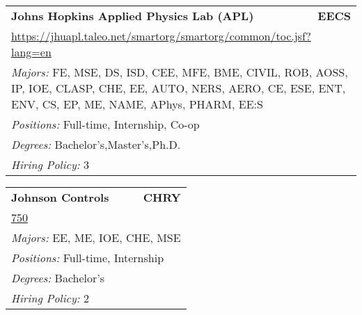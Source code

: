 \documentclass[twoside]{article}
\begin{document}
\begin{center}
\begin{multicols}{3}
\begin{FlushLeft}
\begin{minipage}{.9\columnwidth}\begin{tabularx}{.95\columnwidth}{Xr}
                 {\Large\bf Johns Hopkins Applied Physics Lab (APL)} & {\Large\bf EECS}\\
    \multicolumn{2}{p{.95\columnwidth}}{\url{https://jhuapl.taleo.net/smartorg/smartorg/common/toc.jsf?lang=en}}\\
    \multicolumn{2}{p{.95\columnwidth}}{\emph{Majors:} FE, MSE, DS, ISD, CEE, MFE, BME, CIVIL, ROB, AOSS, IP, IOE, CLASP, CHE, EE, AUTO, NERS, AERO, CE, ESE, ENT, ENV, CS, EP, ME, NAME, APhys, PHARM, EE:S}\\
    \multicolumn{2}{p{.95\columnwidth}}{\emph{Positions:} Full-time, Internship, Co-op}\\
    \multicolumn{2}{p{.95\columnwidth}}{\emph{Degrees:} Bachelor's,Master's,Ph.D.}\\
    \multicolumn{2}{p{.95\columnwidth}}{\emph{Hiring Policy:} 3}\\
    \end{tabularx}
    
\end{minipage}
 
\begin{minipage}{.9\columnwidth}\begin{tabularx}{.95\columnwidth}{Xr}
                 {\Large\bf Johnson Controls} & {\Large\bf CHRY}\\
    \multicolumn{2}{p{.95\columnwidth}}{\url{750}}\\
    \multicolumn{2}{p{.95\columnwidth}}{\emph{Majors:} EE, ME, IOE, CHE, MSE}\\
    \multicolumn{2}{p{.95\columnwidth}}{\emph{Positions:} Full-time, Internship}\\
    \multicolumn{2}{p{.95\columnwidth}}{\emph{Degrees:} Bachelor's}\\
    \multicolumn{2}{p{.95\columnwidth}}{\emph{Hiring Policy:} 2}\\
    \end{tabularx}
    
\end{minipage}
 

\end{FlushLeft}
\end{multicols}
\end{center}
\end{document}
